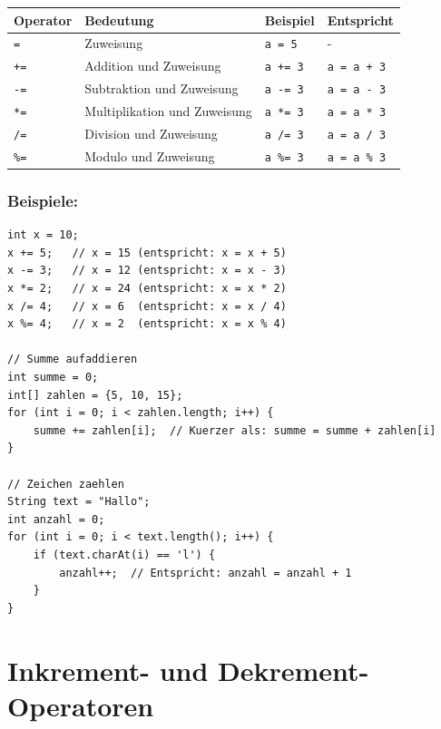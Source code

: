 \begin{center}
	\begin{tabular}{|l|l|l|l|}
		\hline
		\textbf{Operator} & \textbf{Bedeutung} & \textbf{Beispiel} & \textbf{Entspricht} \\
		\hline
		\texttt{=} & Zuweisung & \texttt{a = 5} & - \\
		\hline
		\texttt{+=} & Addition und Zuweisung & \texttt{a += 3} & \texttt{a = a + 3} \\
		\hline
		\texttt{-=} & Subtraktion und Zuweisung & \texttt{a -= 3} & \texttt{a = a - 3} \\
		\hline
		\texttt{*=} & Multiplikation und Zuweisung & \texttt{a *= 3} & \texttt{a = a * 3} \\
		\hline
		\texttt{/=} & Division und Zuweisung & \texttt{a /= 3} & \texttt{a = a / 3} \\
		\hline
		\texttt{\%=} & Modulo und Zuweisung & \texttt{a \%= 3} & \texttt{a = a \% 3} \\
		\hline
	\end{tabular}
\end{center}

\subsubsection*{Beispiele:}
\begin{lstlisting}
int x = 10;
x += 5;   // x = 15 (entspricht: x = x + 5)
x -= 3;   // x = 12 (entspricht: x = x - 3)
x *= 2;   // x = 24 (entspricht: x = x * 2)
x /= 4;   // x = 6  (entspricht: x = x / 4)
x %= 4;   // x = 2  (entspricht: x = x % 4)

// Summe aufaddieren
int summe = 0;
int[] zahlen = {5, 10, 15};
for (int i = 0; i < zahlen.length; i++) {
    summe += zahlen[i];  // Kuerzer als: summe = summe + zahlen[i]
}

// Zeichen zaehlen
String text = "Hallo";
int anzahl = 0;
for (int i = 0; i < text.length(); i++) {
    if (text.charAt(i) == 'l') {
        anzahl++;  // Entspricht: anzahl = anzahl + 1
    }
}
\end{lstlisting}

\newpage


\section*{Inkrement- und Dekrement-Operatoren}

